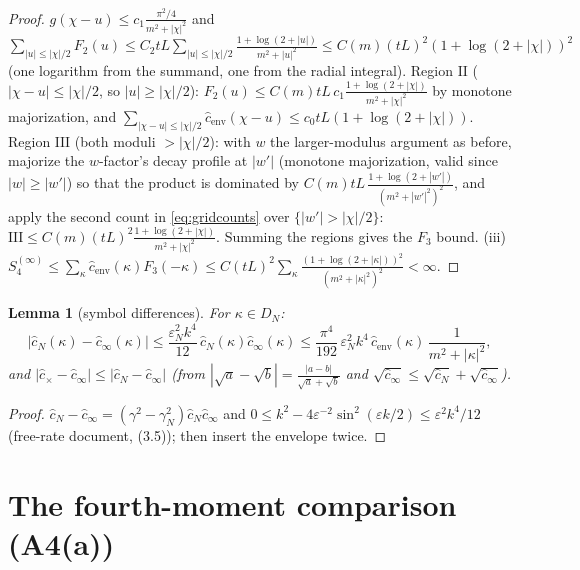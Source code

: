 \documentclass[11pt,a4paper]{article}
\theoremstyle{plain}
\newtheorem{lemma}[theorem]{Lemma}
\theoremstyle{definition}
\newcommand{\eps}{\varepsilon}
\begin{document}
\begin{proof}
$g(\chi-u)\le c_1\frac{\pi^2/4}{m^2+|\chi|^2}$ and
$\sum_{|u|\le|\chi|/2}F_2(u)\le C_2tL\sum_{|u|\le|\chi|/2}
\frac{1+\log(2+|u|)}{m^2+|u|^2}\le C(m)(tL)^2(1+\log(2+|\chi|))^2$
(one logarithm from the summand, one from the radial integral). Region
$\mathrm{II}$ ($|\chi-u|\le|\chi|/2$, so $|u|\ge|\chi|/2$):
$F_2(u)\le C(m)tL\,c_1\frac{1+\log(2+|\chi|)}{m^2+|\chi|^2}$ by monotone
majorization, and $\sum_{|\chi-u|\le|\chi|/2}\hat c_{\mathrm{env}}(\chi-u)
\le c_0tL(1+\log(2+|\chi|))$. Region $\mathrm{III}$ (both moduli
$>|\chi|/2$): with $w$ the larger-modulus argument as before, majorize the
$w$-factor's decay profile at $|w'|$ (monotone majorization, valid since
$|w|\ge|w'|$) so that the product is dominated by
$C(m)tL\,\frac{1+\log(2+|w'|)}{(m^2+|w'|^2)^2}$, and apply the second count
in \eqref{eq:gridcounts} over $\{|w'|>|\chi|/2\}$:
$\mathrm{III}\le C(m)(tL)^2\frac{1+\log(2+|\chi|)}{m^2+|\chi|^2}$. Summing
the regions gives the $F_3$ bound.
(iii) $S_4^{(\infty)}\le\sum_\kappa\hat c_{\mathrm{env}}(\kappa)F_3(-\kappa)
\le C(tL)^2\sum_\kappa\frac{(1+\log(2+|\kappa|))^2}{(m^2+|\kappa|^2)^2}
<\infty$.
\end{proof}

\begin{lemma}[symbol differences]\label{lem:symdiff}
For $\kappa\in D_N$:
\begin{equation}
 \bigl|\hat c_N(\kappa)-\hat c_\infty(\kappa)\bigr|
 \le\frac{\eps_N^2k^4}{12}\,\hat c_N(\kappa)\hat c_\infty(\kappa)
 \le\frac{\pi^4}{192}\,\eps_N^2k^4\,
 \hat c_{\mathrm{env}}(\kappa)\,
 \frac{1}{m^2+|\kappa|^2},
 \label{eq:symdiff}
\end{equation}
and $|\hat c_\times-\hat c_\infty|\le|\hat c_N-\hat c_\infty|$ (from
$|\sqrt a-\sqrt b|=\frac{|a-b|}{\sqrt a+\sqrt b}$ and
$\sqrt{\hat c_\infty}\le\sqrt{\hat c_N}+\sqrt{\hat c_\infty}$).
\end{lemma}

\begin{proof}
$\hat c_N-\hat c_\infty
=(\gamma^2-\gamma_N^2)\hat c_N\hat c_\infty$ and
$0\le k^2-4\eps^{-2}\sin^2(\eps k/2)\le\eps^2k^4/12$ (free-rate document,
(3.5)); then insert the envelope twice.
\end{proof}

\section{The fourth-moment comparison (A4(a))}\label{sec:A4a}
\end{document}

